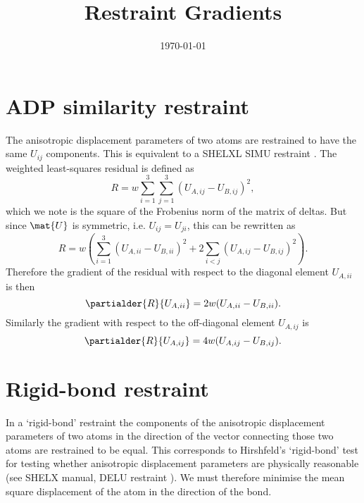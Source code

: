 \documentclass[11pt]{article}
\title{Restraint Gradients}
\author{\rjgildea}
\date{\today}
\begin{document}
\maketitle

\section{ADP similarity restraint}
\label{ADP:similarity}
The anisotropic displacement parameters of two atoms are restrained to have the
same $U_{ij}$ components.  This is equivalent to a SHELXL SIMU restraint \cite{SHELX:man97}.
The weighted least-squares residual is defined as
\begin{equation}
R = w \sum_{i=1}^3 \sum_{j=1}^3 (U_{A,ij} - U_{B,ij})^2,
\end{equation}
which we note is the square of the Frobenius norm of the matrix of deltas.
But since $\mat{U}$ is symmetric, i.e. $U_{ij} = U_{ji}$, this can be rewritten as
\begin{equation}
R = w \left( \sum_{i=1}^3 (U_{A,ii} - U_{B,ii})^2 + 2 \sum_{i < j} (U_{A,ij} - U_{B,ij})^2 \right) .
\end{equation}
Therefore the gradient of the residual with respect to the diagonal element $U_{A,ii}$ is then
\begin{equation}
\partialder{R}{U_{A,ii}} = 2w(U_{A,ii} - U_{B,ii}).
\end{equation}
Similarly the gradient with respect to the off-diagonal element $U_{A,ij}$ is
\begin{equation}
\partialder{R}{U_{A,ij}} = 4w(U_{A,ij} - U_{B,ij}).
\end{equation}

\section{Rigid-bond restraint}

In a `rigid-bond' restraint the components of the anisotropic displacement parameters
of two atoms in the direction of the vector connecting those two atoms are restrained
to be equal.  This corresponds to Hirshfeld's `rigid-bond' test \cite{Hirshfeld:1976} for testing
whether anisotropic displacement parameters are physically reasonable (see SHELX
manual, DELU restraint \cite{SHELX:man97}).  We must therefore minimise the mean square displacement of
the atom in the direction of the bond.
\end{document}
